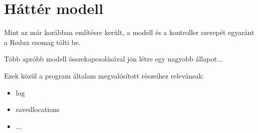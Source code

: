 \section{Háttér modell}

Mint az már korábban említésre került, a modell és a kontroller szerepét
egyaránt a Redux csomag tölti be.

Több apróbb modell összekapcsolásával jön létre egy nagyobb állapot...

Ezek közül a program általam megvalósított részeihez relevánsak:

\begin{itemize}

  \item log
  \item savedlocations
  \item ...

\end{itemize}
